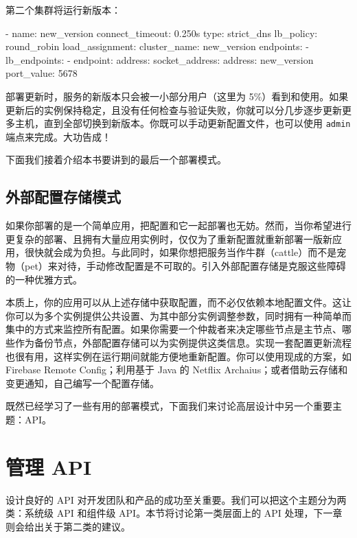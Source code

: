 第二个集群将运行新版本：

\begin{codebox}[yaml]
  - name: new_version
    connect_timeout: 0.250s
    type: strict_dns
    lb_policy: round_robin
    load_assignment:
      cluster_name: new_version
      endpoints:
        - lb_endpoints:
            - endpoint:
                address:
                  socket_address:
                    address: new_version
                    port_value: 5678
\end{codebox}

部署更新时，服务的新版本只会被一小部分用户（这里为 5\%）看到和使用。如果更新后的实例保持稳定，且没有任何检查与验证失败，你就可以分几步逐步更新更多主机，直到全部切换到新版本。你既可以手动更新配置文件，也可以使用 \texttt{admin} 端点来完成。大功告成！

\label{idx:427}
下面我们接着介绍本书要讲到的最后一个部署模式。

\subsection{外部配置存储模式}

\label{idx:428}
如果你部署的是一个简单应用，把配置和它一起部署也无妨。然而，当你希望进行更复杂的部署、且拥有大量应用实例时，仅仅为了重新配置就重新部署一版新应用，很快就会成为负担。与此同时，如果你想把服务当作牛群（cattle）而不是宠物（pet）来对待，手动修改配置是不可取的。引入外部配置存储是克服这些障碍的一种优雅方式。

本质上，你的应用可以从上述存储中获取配置，而不必仅依赖本地配置文件。这让你可以为多个实例提供公共设置、为其中部分实例调整参数，同时拥有一种简单而集中的方式来监控所有配置。如果你需要一个仲裁者来决定哪些节点是主节点、哪些作为备份节点，外部配置存储可以为实例提供这类信息。实现一套配置更新流程也很有用，这样实例在运行期间就能方便地重新配置。你可以使用现成的方案，如 Firebase Remote Config；利用基于 Java 的 Netflix Archaius；或者借助云存储和变更通知，自己编写一个配置存储。


既然已经学习了一些有用的部署模式，下面我们来讨论高层设计中另一个重要主题：API。

\section{管理 API}

\label{idx:429}
设计良好的 API 对开发团队和产品的成功至关重要。我们可以把这个主题分为两类：系统级 API 和组件级 API。本节将讨论第一类层面上的 API 处理，下一章则会给出关于第二类的建议。

